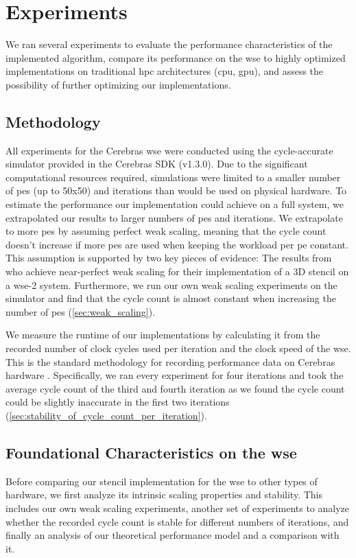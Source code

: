 \chapter{Experiments}
\label{sec:experiments}
We ran several experiments to evaluate the performance characteristics of the implemented algorithm, compare its performance on the \ac{wse} to highly optimized implementations on traditional \ac{hpc} architectures (\ac{cpu}, \ac{gpu}), and assess the possibility of further optimizing our implementations.

\section{Methodology}
All experiments for the Cerebras \ac{wse} were conducted using the cycle-accurate simulator provided in the Cerebras SDK (v1.3.0).
Due to the significant computational resources required, simulations were limited to a smaller number of \acp{pe} (up to 50x50) and iterations than would be used on physical hardware.
To estimate the performance our implementation could achieve on a full system, we extrapolated our results to larger numbers of \acp{pe} and iterations.
We extrapolate to more \acp{pe} by assuming perfect weak scaling, meaning that the cycle count doesn't increase if more \acp{pe} are used when keeping the workload per \ac{pe} constant.
This assumption is supported by two key pieces of evidence: The results from \citeauthor{jacquelin2022scalable} \cite{jacquelin2022scalable} who achieve near-perfect weak scaling for their implementation of a 3D stencil on a \ac{wse}-2 system.
Furthermore, we run our own weak scaling experiments on the simulator and find that the cycle count is almost constant when increasing the number of \acp{pe} (\autoref{sec:weak_scaling}).

We measure the runtime of our implementations by calculating it from the recorded number of clock cycles used per iteration and the clock speed of the \ac{wse}. This is the standard methodology for recording performance data on Cerebras hardware \cite{jacquelin2022scalable}.
Specifically, we ran every experiment for four iterations and took the average cycle count of the third and fourth iteration as we found the cycle count could be slightly inaccurate in the first two iterations (\autoref{sec:stability_of_cycle_count_per_iteration}).

\section{Foundational Characteristics on the \ac{wse}}
Before comparing our stencil implementation for the \ac{wse} to other types of hardware, we first analyze its intrinsic scaling properties and stability.
This includes our own weak scaling experiments, another set of experiments to analyze whether the recorded cycle count is stable for different numbers of iterations, and finally an analysis of our theoretical performance model and a comparison with it. 

